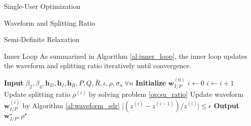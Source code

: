 \documentclass{IEEEtran}
\begin{document}
\begin{section}{Single-User Optimization}
\begin{subsection}{Waveform and Splitting Ratio}
\begin{subsubsection}{Semi-Definite Relaxation}
			\begin{paragraph}{Inner Loop}
				As summarized in Algorithm \ref{al:inner_loop}, the inner loop updates the waveform and splitting ratio iteratively until convergence.
				\begin{algorithm}
					\caption{Inner Loop: Waveform and Splitting Ratio}
					\label{al:inner_loop}
					\begin{algorithmic}[1]
						\State \textbf{Input} $\beta_2,\beta_4,\boldsymbol{h}_D,\boldsymbol{h}_I,\boldsymbol{h}_R,P,Q,\bar{R},\epsilon,\rho,\sigma_n \ \forall n$
						\State \textbf{Initialize} $\boldsymbol{w}_{I/P}^{(0)}$
						\State $i \gets 0$
						\Repeat
						\State $i \gets i + 1$
						\State Update splitting ratio $\rho^{(i)}$ by solving problem \ref{op:su_ratio}
						\State Update waveform $\boldsymbol{w}_{I/P}^{(i)}$ by Algorithm \ref{al:waveform_sdr}
						\Until $\lvert (z^{(i)}-z^{(i-1)}) / z^{(i)} \rvert \le \epsilon$
						\State \textbf{Output} $\boldsymbol{w}_{I/P}^{\star}, \rho^{\star}$
					\end{algorithmic}
				\end{algorithm}
			\end{paragraph}
		\end{subsubsection}
	\end{subsection}


\end{section}
\end{document}
